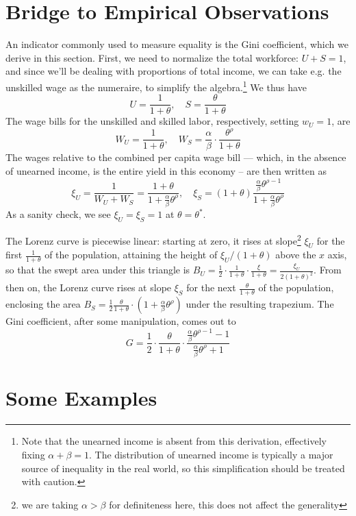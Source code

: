 \documentclass{homework}
\begin{document}
\section{Bridge to Empirical Observations}
An indicator commonly used to measure equality is the Gini coefficient, which we derive in this section. First, we need to normalize the total workforce: $U+S = 1$, and since we'll be dealing with proportions of total income, we can take e.g. the unskilled wage as the numeraire, to simplify the algebra.\footnote{Note that the unearned income is absent from this derivation, effectively fixing $\alpha+\beta=1$. The distribution of unearned income is typically a major source of inequality in the real world, so this simplification should be treated with caution.} We thus have \[U = \frac{1}{1+\theta},\quad S = \frac{\theta}{1+\theta}\]
The wage bills for the unskilled and skilled labor, respectively, setting $w_U=1$, are 
\[W_U = \frac{1}{1+\theta}, \quad W_S = \frac{\alpha}{\beta}\cdot\frac{\theta^\rho}{1+\theta}\]
The wages relative to the combined per capita wage bill --- which, in the absence of unearned income, is the entire yield in this economy -- are then written as
\[\xi_U = \frac{1}{W_U + W_S} = \frac{1+\theta}{1+\frac{\alpha}{\beta}\theta^\rho},
\quad \xi_S = (1+\theta) \frac{\frac{\alpha}{\beta}\theta^{\rho-1}}{1+\frac{\alpha}{\beta}\theta^\rho}\]
As a sanity check, we see $\xi_U = \xi_S = 1$ at $\theta=\theta^*$.

The Lorenz curve is piecewise linear: starting at zero, it rises at slope\footnote{we are taking $\alpha>\beta$ for definiteness here, this does not affect the generality} $\xi_U$ for the first $\frac{1}{1+\theta}$ of the population, attaining the height of $\xi_U/(1+\theta)$ above the $x$ axis, so that the swept area under this triangle is $B_U = \frac{1}{2}\cdot\frac{1}{1+\theta}\cdot\frac{\xi}{1+\theta} = \frac{\xi_U}{2(1+\theta)^2}$. From then on, the Lorenz curve rises at slope $\xi_S$ for the next $\frac{\theta}{1+\theta}$ of the population, enclosing the area $B_S = \frac{1}{2}\frac{\theta}{1+\theta}\cdot(1+\frac{\alpha}{\beta}\theta^\rho)$ under the resulting trapezium. The Gini coefficient, after some manipulation, comes out to
\[ G = \frac{1}{2}\cdot\frac{\theta}{1+\theta}\cdot\frac{\frac{\alpha}{\beta}\theta^{\rho-1}-1}{\frac{\alpha}{\beta}\theta^\rho+1} \]

\section{Some Examples}
\end{document}
